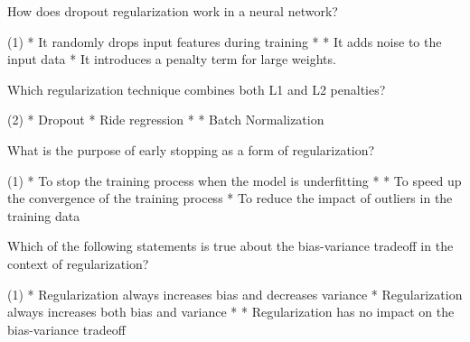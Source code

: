 \documentclass[11pt]{extarticle}
\begin{document}
\begin{exercise}
    How does dropout regularization work in a neural network?
    \begin{choice}(1)
        * It randomly drops input features during training
        * 
        * It adds noise to the input data
        * It introduces a penalty term for large weights.
    \end{choice}
\end{exercise}
\begin{solution}
\end{solution}

\begin{exercise}
    Which regularization technique combines both L1 and L2 penalties?
    \begin{choice} (2)
        * Dropout
        * Ride regression
        * 
        * Batch Normalization
    \end{choice}
\end{exercise}
\begin{solution}
\end{solution}

\begin{exercise}
    What is the purpose of early stopping as a form of regularization?
    \begin{choice} (1)
        * To stop the training process when the model is underfitting
        * 
        * To speed up the convergence of the training process
        * To reduce the impact of outliers in the training data
    \end{choice}
\end{exercise}
\begin{solution}
\end{solution}

\begin{exercise}
    Which of the following statements is true about the bias-variance tradeoff in the context of regularization?
    \begin{choice} (1)
        * Regularization always increases bias and decreases variance
        * Regularization always increases both bias and variance
        * 
        * Regularization has no impact on the bias-variance tradeoff
    \end{choice}
\end{exercise}
\begin{solution}
\end{solution}
\end{document}
